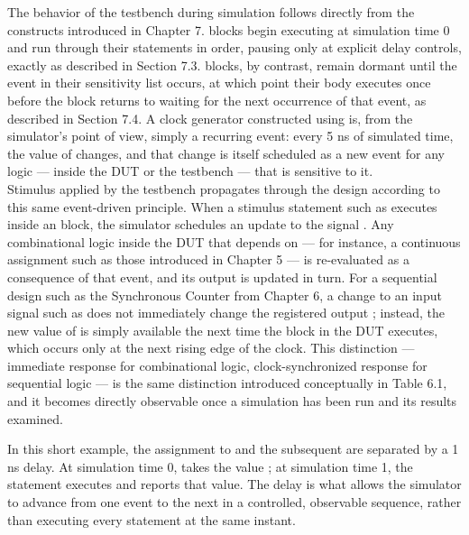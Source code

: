 The behavior of the testbench during simulation follows directly from the constructs introduced in Chapter 7.  blocks begin executing at simulation time 0 and run through their statements in order, pausing only at explicit delay controls, exactly as described in Section 7.3.  blocks, by contrast, remain dormant until the event in their sensitivity list occurs, at which point their body executes once before the block returns to waiting for the next occurrence of that event, as described in Section 7.4. A clock generator constructed using  is, from the simulator's point of view, simply a recurring event: every 5 ns of simulated time, the value of  changes, and that change is itself scheduled as a new event for any logic --- inside the DUT or the testbench --- that is sensitive to it.\\

Stimulus applied by the testbench propagates through the design according to this same event-driven principle. When a stimulus statement such as  executes inside an  block, the simulator schedules an update to the signal . Any combinational logic inside the DUT that depends on  --- for instance, a continuous assignment such as those introduced in Chapter 5 --- is re-evaluated as a consequence of that event, and its output is updated in turn. For a sequential design such as the Synchronous Counter from Chapter 6, a change to an input signal such as  does not immediately change the registered output ; instead, the new value of  is simply available the next time the  block in the DUT executes, which occurs only at the next rising edge of the clock. This distinction --- immediate response for combinational logic, clock-synchronized response for sequential logic --- is the same distinction introduced conceptually in Table 6.1, and it becomes directly observable once a simulation has been run and its results examined.


In this short example, the assignment to  and the subsequent  are separated by a 1 ns delay. At simulation time 0,  takes the value ; at simulation time 1, the  statement executes and reports that value. The delay is what allows the simulator to advance from one event to the next in a controlled, observable sequence, rather than executing every statement at the same instant.\\


